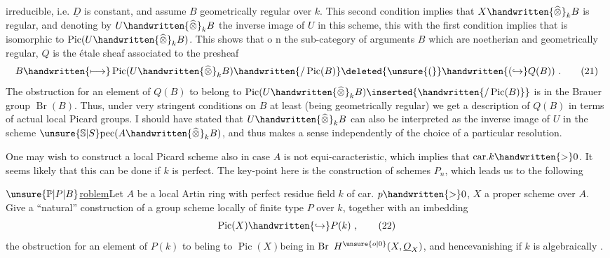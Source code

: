 irreducible, i.e. $\underline{D}$ is constant, and assume $B$ geometrically regular over $k$. This second condition implies that $X\handwritten{\widehat{\otimes}}_k B$ is regular, and denoting by $U\handwritten{\widehat{\otimes}}_k B$ the inverse image of $U$ in this scheme,  this  with the first condition implies that  is isomorphic to $\operatorname{Pic}(U\handwritten{\widehat{\otimes}}_k B)$. This shows that o n the sub-category of arguments $B$ which are  noetherian and geometrically regular, $Q$ is the étale sheaf associated to the presheaf
\[
B\handwritten{\longmapsto}\operatorname{Pic}(U\handwritten{\widehat{\otimes}}_k B)\handwritten{/\operatorname{Pic}(B)}\deleted{\unsure{(}}\handwritten{(\hookrightarrow}Q(B))\ .
\tag*{(21)}
\]
The obstruction for an element of $Q(B)$ to belong to $\operatorname{Pic}(U\handwritten{\widehat{\otimes}}_k B)\inserted{\handwritten{/\operatorname{Pic}(B)}}$ is in the Brauer group $\operatorname{Br}(B)$. Thus, under very stringent conditions on $B$ at least (being geometrically regular) we get a description of $Q(B)$ in terms of actual local Picard groups. I should have stated that $U\handwritten{\widehat{\otimes}}_k B$ can also be interpreted as the inverse image of $U$ in the scheme $\unsure{\mathbb{S}|S}\mathrm{pec}(A\handwritten{\widehat{\otimes}}_k B)$, and thus makes a sense independently of the choice of a particular resolution.

One may wish to construct a local Picard scheme  also in case $A$ is not equi-caracteristic, which implies that $\mathrm{car}.k\handwritten{>}0$. It seems likely that this can be done if $k$ is perfect. The key-point here   is the construction of schemes $P_n$, which leads us to the following

\uline{$\unsure{\mathbb{P}|P|B}$roblem}\quad Let $A$ be a local Artin ring with perfect residue field $k$ of car. $p\handwritten{>}0$, $X$ a proper scheme over $A$. Give a ``natural'' construction of a group scheme locally of finite type $P$ over $k$, together with an imbedding
\[
\operatorname{Pic}(X)\handwritten{\hookrightarrow}P(k)\ ,
\tag*{(22)}
\]
the obstruction for an element of $P(k)$ to beling to $\operatorname{Pic}(X)$\handwritten{(}being in $\operatorname{Br}\ H^{\unsure{o|0}}(X,\underline{O}_X)$, and hence\handwritten{)}vanishing if $k$ is algebraically .
